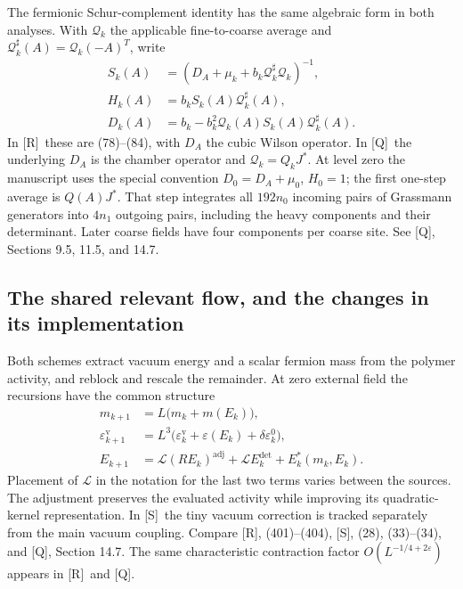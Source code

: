 \documentclass[11pt]{article}
\numberwithin{equation}{section}
\newcommand{\Q}{\textup{[Q]}}
\newcommand{\UR}{\textup{[R]}}
\newcommand{\US}{\textup{[S]}}
\begin{document}
The fermionic Schur-complement identity has the same algebraic form
in both analyses. With $\mathcal Q_k$ the applicable fine-to-coarse
average and $\mathcal Q_k^\sharp(A)=\mathcal Q_k(-A)^T$, write
\begin{align}
 S_k(A)&=(D_A+\mu_k+b_k\mathcal Q_k^\sharp\mathcal Q_k)^{-1},\\
 H_k(A)&=b_kS_k(A)\mathcal Q_k^\sharp(A),\\
 D_k(A)&=b_k-b_k^2\mathcal Q_k(A)S_k(A)\mathcal Q_k^\sharp(A).
 \label{eq:digest-fermion-block}
\end{align}
In \UR\ these are (78)--(84), with $D_A$ the cubic Wilson operator.
In \Q\ the underlying $D_A$ is the chamber operator and
$\mathcal Q_k=Q_kJ^*$. At level zero the manuscript uses the special
convention $D_0=D_A+\mu_0$, $H_0=1$; the first one-step average is
$Q(A)J^*$. That step integrates all $192n_0$ incoming pairs of
Grassmann generators into $4n_1$ outgoing pairs, including the heavy
components and their determinant. Later coarse fields have four
components per coarse site. See \Q, Sections 9.5, 11.5, and 14.7.

\subsection{The shared relevant flow, and the changes in its implementation}

Both schemes extract vacuum energy and a scalar fermion mass from
the polymer activity, and reblock and rescale the remainder. At zero
external field the recursions have the common structure
\begin{align}
 m_{k+1}&=L\bigl(m_k+m(E_k)\bigr),\\
 \varepsilon^{\mathrm v}_{k+1}
   &=L^3\bigl(\varepsilon^{\mathrm v}_k+
                  \varepsilon(E_k)+\delta\varepsilon_k^0\bigr),\\
 E_{k+1}&=\mathcal L(RE_k)^{\mathrm{adj}}
                   +\mathcal L E_k^{\mathrm{det}}+E_k^*(m_k,E_k).
 \label{eq:digest-flow}
\end{align}
Placement of $\mathcal L$ in the notation for the last two terms
varies between the sources. The adjustment preserves the evaluated
activity while improving its quadratic-kernel representation.
In \US\ the tiny vacuum correction is tracked separately from
the main vacuum coupling.
Compare \UR, (401)--(404), \US, (28), (33)--(34), and \Q, Section 14.7.
The same characteristic contraction factor
$O(L^{-1/4+2\varepsilon})$ appears in \UR\ and \Q.
\end{document}
